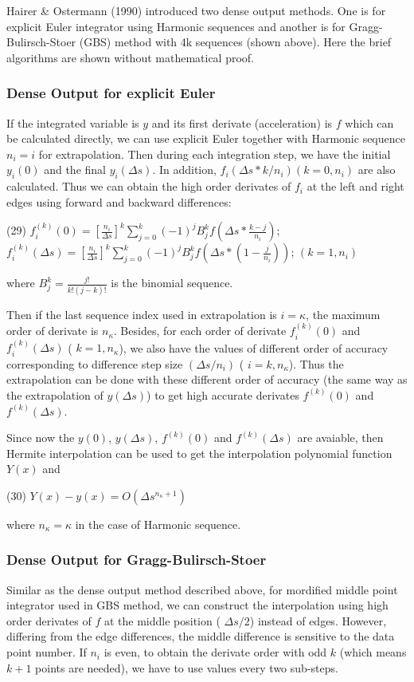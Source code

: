 Hairer \& Ostermann (1990) introduced two dense output methods. One is for explicit Euler integrator using Harmonic sequences and another is for Gragg-\/\+Bulirsch-\/\+Stoer (G\+BS) method with 4k sequences (shown above). Here the brief algorithms are shown without mathematical proof.\hypertarget{index_euler_dense_sec}{}\subsubsection{Dense Output for explicit Euler}\label{index_euler_dense_sec}
If the integrated variable is $ y $ and its first derivate (acceleration) is $ f $ which can be calculated directly, we can use explicit Euler together with Harmonic sequence $ n_i = i$ for extrapolation. Then during each integration step, we have the initial $ y_i(0) $ and the final $ y_i(\Delta s) $. In addition, $ f_i(\Delta s* k/n_i) (k=0,n_i)$ are also calculated. Thus we can obtain the high order derivates of $ f_i $ at the left and right edges using forward and backward differences\+:

(29) $ f_i^{(k)}(0) = \left[\frac{n_i}{\Delta s}\right]^k \sum_{j=0}^k (-1)^j B_j^k f( \Delta s*\frac{k-j}{n_i}) $; $ f_i^{(k)}(\Delta s) = \left[\frac{n_i}{\Delta s}\right]^k \sum_{j=0}^k (-1)^j B_j^k f(\Delta s*(1-\frac{j}{n_i})) $; $(k=1, n_i) $

where $ B_j^k = \frac{j!}{k!(j-k)!}$ is the binomial sequence.

Then if the last sequence index used in extrapolation is $i=\kappa$, the maximum order of derivate is $ n_\kappa$. Besides, for each order of derivate $ f_i^{(k)}(0) $ and $ f_i^{(k)}(\Delta s)$ ( $ k=1,n_\kappa$), we also have the values of different order of accuracy corresponding to difference step size $(\Delta s/n_i)$ ( $ i=k,n_\kappa$). Thus the extrapolation can be done with these different order of accuracy (the same way as the extrapolation of $y(\Delta s)$) to get high accurate derivates $f^{(k)}(0)$ and $f^{(k)}(\Delta s)$.

Since now the $ y(0)$, $y(\Delta s)$, $f^{(k)}(0)$ and $f^{(k)}(\Delta s)$ are avaiable, then Hermite interpolation can be used to get the interpolation polynomial function $ Y(x) $ and

(30) $ Y(x) - y(x) = O(\Delta s^{n_\kappa+1}) $

where $ n_\kappa = \kappa $ in the case of Harmonic sequence.\hypertarget{index_gbs_dense_sec}{}\subsubsection{Dense Output for Gragg-\/\+Bulirsch-\/\+Stoer}\label{index_gbs_dense_sec}
Similar as the dense output method described above, for mordified middle point integrator used in G\+BS method, we can construct the interpolation using high order derivates of $ f $ at the middle position ( $\Delta s/2$) instead of edges. However, differing from the edge differences, the middle difference is sensitive to the data point number. If $ n_i$ is even, to obtain the derivate order with odd $ k $ (which means $k+1$ points are needed), we have to use values every two sub-\/steps.


